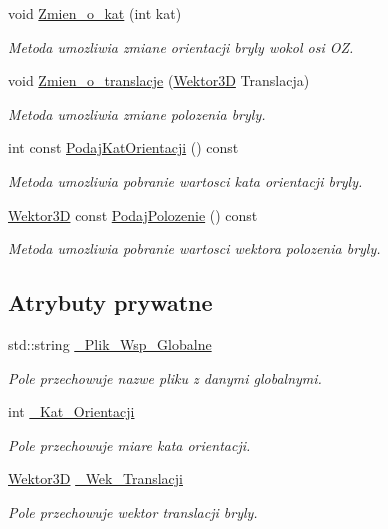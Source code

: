 \begin{DoxyCompactItemize}
void \hyperlink{classProstopadloscianSCN_a1f9b715a50dd0e84fb6391dcccc962e8}{Zmien\+\_\+o\+\_\+kat} (int kat)
\begin{DoxyCompactList}\small\item\em Metoda umozliwia zmiane orientacji bryly wokol osi OZ. \end{DoxyCompactList}\item 
void \hyperlink{classProstopadloscianSCN_afa54ddf8455489f51aa945afcafee27f}{Zmien\+\_\+o\+\_\+translacje} (\hyperlink{classSWektor}{Wektor3D} Translacja)
\begin{DoxyCompactList}\small\item\em Metoda umozliwia zmiane polozenia bryly. \end{DoxyCompactList}\item 
int const \hyperlink{classProstopadloscianSCN_a4d1aaf928130a4d48a0cdc9ab79917be}{Podaj\+Kat\+Orientacji} () const
\begin{DoxyCompactList}\small\item\em Metoda umozliwia pobranie wartosci kata orientacji bryly. \end{DoxyCompactList}\item 
\hyperlink{classSWektor}{Wektor3D} const \hyperlink{classProstopadloscianSCN_ae0157d734326422f325c9af1894292ed}{Podaj\+Polozenie} () const
\begin{DoxyCompactList}\small\item\em Metoda umozliwia pobranie wartosci wektora polozenia bryly. \end{DoxyCompactList}\end{DoxyCompactItemize}
\subsection*{Atrybuty prywatne}
\begin{DoxyCompactItemize}
\item 
std\+::string \hyperlink{classProstopadloscianSCN_ab6ed51a7c62d80bca489497ad60a861c}{\+\_\+\+Plik\+\_\+\+Wsp\+\_\+\+Globalne}
\begin{DoxyCompactList}\small\item\em Pole przechowuje nazwe pliku z danymi globalnymi. \end{DoxyCompactList}\item 
int \hyperlink{classProstopadloscianSCN_ab47d8efc8b2817cabf5ea70915a8f5dc}{\+\_\+\+Kat\+\_\+\+Orientacji}
\begin{DoxyCompactList}\small\item\em Pole przechowuje miare kata orientacji. \end{DoxyCompactList}\item 
\hyperlink{classSWektor}{Wektor3D} \hyperlink{classProstopadloscianSCN_a4ca4e6e7fe68e627d4a3f6373f1482ad}{\+\_\+\+Wek\+\_\+\+Translacji}
\begin{DoxyCompactList}\small\item\em Pole przechowuje wektor translacji bryly. \end{DoxyCompactList}\end{DoxyCompactItemize}


